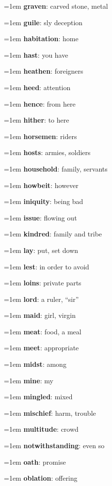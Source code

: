 {\begin{multicols}{3}
{\hangindent=1em \textbf{graven}: carved stone, metal\par
\hangindent=1em \textbf{guile}: sly deception\par
\hangindent=1em \textbf{habitation}: home\par
\hangindent=1em \textbf{hast}: you have\par
\hangindent=1em \textbf{heathen}: foreigners\par
\hangindent=1em \textbf{heed}: attention\par
\hangindent=1em \textbf{hence}: from here\par
\hangindent=1em \textbf{hither}: to here\par
\hangindent=1em \textbf{horsemen}: riders\par
\hangindent=1em \textbf{hosts}: armies, soldiers\par
\hangindent=1em \textbf{household}: family, servants\par
\hangindent=1em \textbf{howbeit}: however\par
\hangindent=1em \textbf{iniquity}: being bad\par
\hangindent=1em \textbf{issue}: flowing out\par
\hangindent=1em \textbf{kindred}: family and tribe\par
\hangindent=1em \textbf{lay}: put, set down\par
\hangindent=1em \textbf{lest}: in order to avoid\par
\hangindent=1em \textbf{loins}: private parts\par
\hangindent=1em \textbf{lord}: a ruler, “sir”\par
\hangindent=1em \textbf{maid}: girl, virgin\par
\hangindent=1em \textbf{meat}: food, a meal\par
\hangindent=1em \textbf{meet}: appropriate\par
\hangindent=1em \textbf{midst}: among\par
\hangindent=1em \textbf{mine}: my\par
\hangindent=1em \textbf{mingled}: mixed\par
\hangindent=1em \textbf{mischief}: harm, trouble\par
\hangindent=1em \textbf{multitude}: crowd\par
\hangindent=1em \textbf{notwithstanding}: even so\par
\hangindent=1em \textbf{oath}: promise\par
\hangindent=1em \textbf{oblation}: offering\par
}
\end{multicols}}
